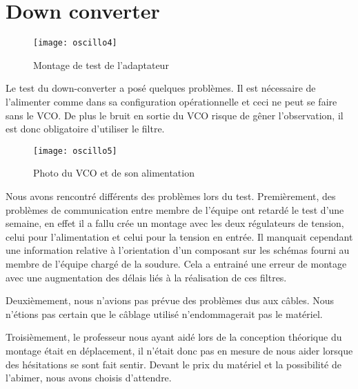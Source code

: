 \section{Down converter}
\label{sec:down_converter}



\begin{figure}[h]
  \centering
  \texttt{[image: oscillo4]}
  \caption{Montage de test de l’adaptateur}
  \label{fig:mont}
\end{figure}


Le test du down-converter a posé quelques problèmes. Il est nécessaire de l’alimenter comme dans sa configuration opérationnelle et ceci ne peut se faire sans le VCO. De plus le bruit en sortie du VCO risque de gêner l’observation, il est donc obligatoire d'utiliser le filtre.


\begin{figure}[h]
  \centering
  \texttt{[image: oscillo5]}
  \caption{Photo du VCO et de son alimentation}
  \label{fig:photo}
\end{figure}



Nous avons rencontré différents des problèmes lors du test. Premièrement, des problèmes de communication entre membre de l’équipe ont retardé le test d’une semaine, en effet il a fallu crée un montage avec les deux régulateurs de tension, celui pour l’alimentation et celui pour la tension en entrée. Il manquait cependant une information relative à l'orientation d'un composant sur les schémas fourni au membre de l'équipe chargé de la soudure. Cela a entrainé une erreur de montage avec une augmentation des délais liés à la réalisation de ces filtres.

Deuxièmement, nous n’avions pas prévue des problèmes dus aux câbles. Nous n'étions pas certain que le câblage utilisé n'endommagerait pas le matériel.

Troisièmement, le professeur nous ayant aidé lors de la conception théorique du montage était en déplacement, il n’était donc pas en mesure de nous aider lorsque des hésitations se sont fait sentir. Devant le prix du matériel et la possibilité de l'abimer, nous avons choisis d'attendre.


